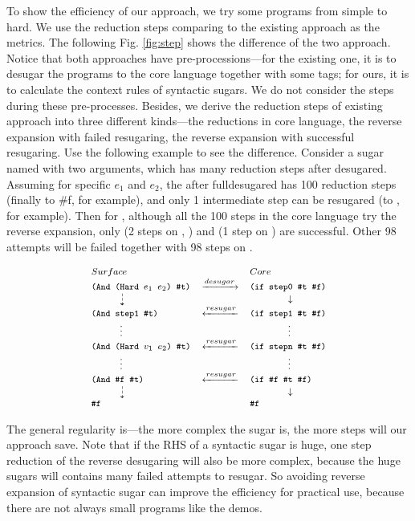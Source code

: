 To show the efficiency of our approach, we try some programs from simple to hard. We use the reduction steps comparing to the existing approach as the metrics. The following Fig. \ref{fig:step} shows the difference of the two approach. Notice that both approaches have pre-processions---for the existing one, it is to desugar the programs to the core language together with some tags; for ours, it is to calculate the context rules of syntactic sugars. We do not consider the steps during these pre-processes. Besides, we derive the reduction steps of existing approach into three different kinds---the reductions in core language, the reverse expansion with failed resugaring, the reverse expansion with successful resugaring.  Use the following example to see the difference. Consider a sugar named  with two arguments, which has many reduction steps after desugared. Assuming for specific $e_1$ and $e_2$, the  after fulldesugared has 100 reduction steps (finally to \#f, for example), and only 1 intermediate step can be resugared (to , for example). Then for , although all the 100 steps in the core language try the reverse expansion, only  (2 steps on , ) and  (1 step on ) are successful. Other 98 attempts will be failed together with 98 steps on .

\[
{\footnotesize
	\begin{array}{lcl}
	Surface&&Core\\
	\Code{(And (Hard $e_1$ $e_2$) \#t)}&\xrightarrow{desugar}&\Code{(if step0 \#t \#f)}\\
	\qquad\quad\dashdownarrow& &\qquad\qquad\downarrow\\
	\Code{(And step1 \#t)}&\xleftarrow{resugar}&\Code{(if step1 \#t \#f)}\\
	\qquad\quad\vdots& &\qquad\qquad\vdots\\
	\Code{(And (Hard $v_1$ $e_2$) \#t)}&\xleftarrow{resugar}&\Code{(if stepn \#t \#f)}\\
	\qquad\quad\vdots& &\qquad\qquad\vdots\\
	\Code{(And \#f \#t)}&\xleftarrow{resugar}& \Code{(if \#f \#t \#f)}\\
	\qquad\quad\dashdownarrow& &\qquad\qquad\downarrow\\
	\Code{\#f}&& \Code{\#f}\\
\end{array}
}
\]


The general regularity is---the more complex the sugar is, the more steps will our approach save. Note that if the RHS of a syntactic sugar is huge, one step reduction of the reverse desugaring will also be more complex, because the huge sugars will contains many failed attempts to resugar. So avoiding reverse expansion of syntactic sugar can improve the efficiency for practical use, because there are not always small programs like the demos.
